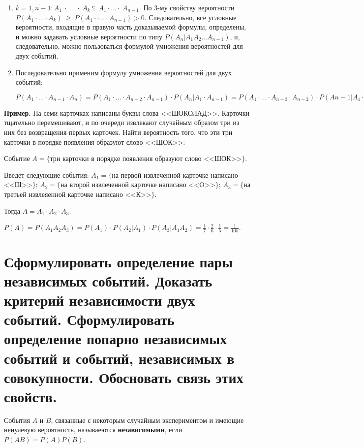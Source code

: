\begin{enumerate}
	\item $k = \overline{1, n - 1}: A_1~\cdot~...~\cdot~A_k\subseteqq~A_1\cdot...\cdot~A_{n-1}$. По 3-му свойству вероятности $P(A_1\cdot...\cdot A_k)~\geq~P(A_1\cdot \cdot ...\cdot A_{n-1})>0$. Следовательно, все условные вероятности, входящие в правую часть доказываемой формулы, определены, и можно задавать условные вероятности по типу $P(A_n|A_1A_2...A_{n-1})$, и, следовательно, можно пользоваться формулой умножения вероятностей для двух событий.
	
	\item Последовательно применим формулу умножения вероятностей для двух событий: 
	
	$P(A_1 \cdot ... \cdot A_{n-1} \cdot A_n) = P(A_1 \cdot ... \cdot A_{n-2} \cdot A_{n-1}) \cdot P(A_n | A_1 \cdot A_{n-1}) = P(A_1 \cdot ... \cdot A_{n-3} \cdot A_{n-2}) \cdot P(A{n-1} | A_1 \cdot \cdot ... \cdot A_{n-2}) \cdot P(A_n | A_1 \cdot ... \cdot A_{n-1}) = P(A_1)P(A_2|A_1)P(A_3|A_1A_2) \cdot ... \cdot P(A_n|A_1 ... A_{n-1}).$
\end{enumerate}

\textbf{Пример.} На семи карточках написаны буквы слова <<ШОКОЛАД>>. Карточки тщательно перемешивают, и по очереди извлекают случайным образом три из них без возвращения первых карточек. Найти вероятность того, что эти три карточки в порядке появления образуют слово <<ШОК>>:

Событие $A = \{$три карточки в порядке появления образуют слово <<ШОК>>$\}$.

Введет следующие события: 
$A_1 = \{$на первой извлеченной карточке написано <<Ш>>$\}$;
$A_2 = \{$на второй извлеченной карточке написано <<O>>$\}$;
$A_3 = \{$на третьей извлеяенной карточке написано <<К>>$\}$.

Тогда $A = A_1 \cdot A_2 \cdot A_3$.

$P(A) = P(A_1A_2A_3) = P(A_1) \cdot P(A_2|A_1) \cdot P(A_3|A_1A_2) = \frac{1}{7} \cdot \frac{2}{6} \cdot \frac{1}{5} = \frac{1}{105}$.

\section{Сформулировать определение пары независимых событий. Доказать критерий независимости двух событий. Сформулировать определение попарно независимых событий и событий, независимых в совокупности. Обосновать связь этих свойств.}

События $A$ и $B$, связанные с некоторым случайным экспериментом и имеющие ненулевую вероятность, называеются \textbf{независимыми}, если $P(AB) = P(A)P(B)$.

